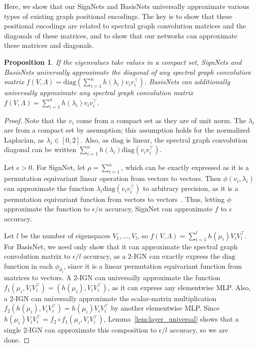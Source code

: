 \documentclass{article} \usepackage{iclr2023_conference,times}
\newcommand{\mrm}[1]{\mathrm{#1}}
\newtheorem{proposition}{Proposition}
\begin{document}
Here, we show that our SignNets and BasisNets universally approximate various types of existing graph positional encodings. The key is to show that these positional encodings are related to spectral graph convolution matrices and the diagonals of these matrices, and to show that our networks can approximate these matrices and diagonals.

\begin{proposition}\label{prop:diag_spectral_conv}
    If the eigenvalues take values in a compact set, SignNets and BasisNets universally approximate the diagonal of any spectral graph convolution matrix $f(V, \Lambda) = \mrm{diag}\left(\sum_{i=1}^n h(\lambda_i) v_iv_i^\top \right)$. BasisNets can additionally universally approximate any spectral graph convolution matrix $f(V, \Lambda) = \sum_{i=1}^n h(\lambda_i) v_i v_i^\top$.
\end{proposition}
\begin{proof}
 Note that the $v_i$ come from a compact set as they are of unit norm. The $\lambda_i$ are from a compact set by assumption; this assumption holds for the normalized Laplacian, as $\lambda_i \in [0,2]$. Also, as $\mrm{diag}$ is linear, the spectral graph convolution diagonal can be written $\sum_{i=1}^n h(\lambda_i) \mrm{diag}(v_i v_i^\top)$.

    Let $\epsilon > 0$. For SignNet, let $\rho = \sum_{i=1}^n$, which can be exactly expressed as it is a permutation equivariant linear operation from vectors to vectors. Then $\phi(v_i, \lambda_i)$ can approximate the function $\lambda_i \mrm{diag}(v_i v_i^\top)$ to arbitrary precision, as it is a permutation equivariant function from vectors to vectors~\citep{segol2019universal}. Thus, letting $\phi$ approximate the function to $\epsilon/n$ accuracy, SignNet can approximate $f$ to $\epsilon$ accuracy.

    Let $l$ be the number of eigenspaces $V_1, \ldots, V_l$, so $f(V, \Lambda) = \sum_{i=1}^l h(\mu_i) V_i V_i^\top$. For BasisNet, we need only show that it can approximate the spectral graph convolution matrix to $\epsilon / l$ accuracy, as a 2-IGN can exactly express the $\mrm{diag}$ function in each $\phi_{d_i}$, since it is a linear permutation equivariant function from matrices to vectors. A 2-IGN can universally approximate the function $f_1(\mu_i, V_iV_i^\top) = (h(\mu_i), V_iV_i^\top)$, as it can express any elementwise MLP. Also, a 2-IGN can universally approximate the scalar-matrix multiplication $f_2(h(\mu_i), V_i V_i^\top) = h(\mu_i)V_i V_i^\top$ by another elementwise MLP. Since $h(\mu_i)V_i V_i^\top = f_2 \circ f_1(\mu_i, V_i V_i^\top)$, Lemma~\ref{lem:layer_universal} shows that a single 2-IGN can approximate this composition to $\epsilon/l$ accuracy, so we are done.

\end{proof}
\end{document}
